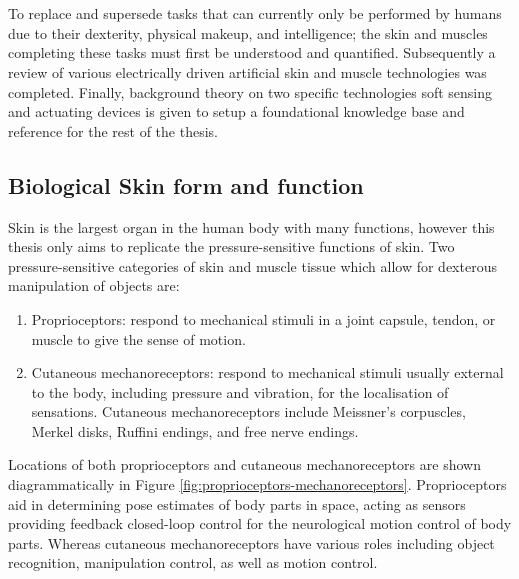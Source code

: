 \chapter{\chapiiname}
\label{chapter2}
To replace and supersede tasks that can currently only be performed by humans due to their dexterity, physical makeup, and intelligence; the skin and muscles completing these tasks must first be understood and quantified. Subsequently a review of various electrically driven artificial skin and muscle technologies was completed. Finally, background theory on two specific technologies soft sensing and actuating devices is given to setup a foundational knowledge base and reference for the rest of the thesis. 
    
\section{Biological Skin form and function}
Skin is the largest organ in the human body with many functions, however this thesis only aims to replicate the pressure-sensitive functions of skin. Two pressure-sensitive categories of skin and muscle tissue which allow for dexterous manipulation of objects are:
\begin{enumerate} 
    \item Proprioceptors: respond to mechanical stimuli in a joint capsule, tendon, or muscle to give the sense of motion.
    \item Cutaneous mechanoreceptors:  respond to mechanical stimuli usually external to the body, including pressure and vibration, for the localisation of sensations. Cutaneous mechanoreceptors include Meissner's corpuscles, Merkel disks, Ruffini endings, and free nerve endings. 
\end{enumerate} 
Locations of both proprioceptors and cutaneous mechanoreceptors are shown diagrammatically in Figure \ref{fig:proprioceptors-mechanoreceptors}. Proprioceptors aid in determining pose estimates of body parts in space, acting as sensors providing feedback closed-loop control for the neurological motion control of body parts. Whereas cutaneous mechanoreceptors have various roles including object recognition, manipulation control, as well as motion control.
